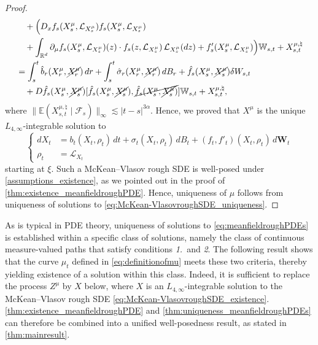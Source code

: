 \documentclass[10pt, a4paper]{article} %
\newcommand{\R}{\mathbb{R}}
\newcommand{\E}{\mathbb{E}}
\theoremstyle{definition}
\theoremstyle{plain}
\begin{document}
\begin{proof}
\begin{equation*}
\begin{split}
            & \quad  + \Big(D_x f_s(X^\mu_s,\mathcal{L}_{X^\mu_s}) f_s(X^\mu_s,\mathcal{L}_{X^\mu_s})   \\
            & \quad + \int_{\R^d} \partial_\mu f_s(X^\mu_s,\mathcal{L}_{X^\mu_s})(z) \cdot f_s(z,\mathcal{L}_{X^\mu_s}) \, \mathcal{L}_{X^\mu_s} (dz) + f_s'(X^\mu_s,\mathcal{L}_{X^\mu_s}) \Big) \mathbb{W}_{s,t} + X^{\mu,\natural}_{s,t}  \\
            &= \int_s^t \hat{b}_r(X^\mu_r , \cancel{X^\mu_r}) \, dr + \int_s^t \hat{\sigma}_r(X^\mu_r , \cancel{X^\mu_r}) \, dB_r +  \hat{f}_s(X^\mu_s,\cancel{X^\mu_s}) \delta W_{s,t}  \\
            & \quad + D\hat{f}_s(X^\mu_s,\cancel{X^\mu_s}) [\hat{f}_s(X^\mu_s,\cancel{X^\mu_s}), \cancel{\hat{f}_s(X^\mu_s,\cancel{X^\mu_s})}] \mathbb{W}_{s,t} + X^{\mu,\natural}_{s,t} ,
        \end{split}
    \end{equation*}
    where $\|\E(X^{\mu,\natural}_{s,t} \mid \mathcal{F}_s) \|_\infty \lesssim |t-s|^{3\alpha}$. Hence, we proved that $X^\mu$ is the unique $L_{4,\infty}$-integrable solution to \begin{equation} \label{eq:McKean-VlasovroughSDE_uniqueness}
    \begin{cases}
        dX_t &= b_t(X_t,\rho_t) \, dt + \sigma_t(X_t,\rho_t) \, dB_t + (f_t,f'_t)(X_t,\rho_t) \, d\mathbf{W}_t \\
        \rho_t &= \mathcal{L}_{X_t}
    \end{cases}
    \end{equation} 
    starting at $\xi$.
    Such a McKean--Vlasov rough SDE is well-posed under \cref{assumptions_existence}, as we pointed out in the proof of \cref{thm:existence_meanfieldroughPDE}. Hence, uniqueness of $\mu$ follows from uniqueness of solutions to \eqref{eq:McKean-VlasovroughSDE_uniqueness}.     
\end{proof}  


As is typical in PDE theory, uniqueness of solutions to \eqref{eq:meanfieldroughPDEs} is established within a specific class of solutions, namely the class of continuous measure-valued paths that satisfy conditions \textit{1.}\ and \textit{2}.
The following result shows that the curve $\mu_t$ defined in \eqref{eq:definitionofmu} meets these two criteria, {thereby yielding existence of a solution within this class}.  
Indeed, it is sufficient to replace the process $Z^\mu$ by $X$ below, where $X$ is an $L_{4,\infty}$-integrable solution to the McKean--Vlasov rough SDE \eqref{eq:McKean-VlasovroughSDE_existence}. 
{
\cref{thm:existence_meanfieldroughPDE} and \cref{thm:uniqueness_meanfieldroughPDEs} can therefore be combined into a unified well-posedness result, as stated in \cref{thm:mainresult}.}
\end{document}
